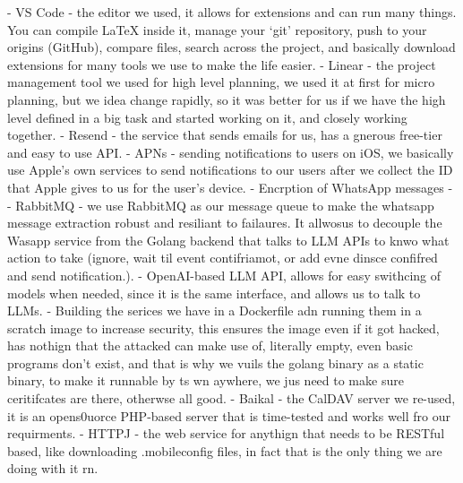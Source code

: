 - VS Code - the editor we used, it allows for extensions and can run many things. You can compile LaTeX inside it, manage your `git' repository, push to your origins (GitHub), compare files, search across the project, and basically download extensions for many tools we use to make the life easier.
- Linear - the project management tool we used for high level planning, we used it at first for micro planning, but we idea change rapidly, so it was better for us if we have the high level defined in a big task and started working on it, and closely working together.
- Resend - the service that sends emails for us, has a gnerous free-tier and easy to use API.
- APNs - sending notifications to users on iOS, we basically use Apple's own services to send notifications to our users after we collect the ID that Apple gives to us for the user's device.
- Encrption of WhatsApp messages - 
- RabbitMQ - we use RabbitMQ as our message queue to make the whatsapp message extraction robust and resiliant to failaures. It allwosus to decouple the Wasapp service from the Golang backend that talks to LLM APIs to knwo what action to take (ignore, wait til event contifriamot, or add evne dinsce confifred and send notification.).
- OpenAI-based LLM API, allows for easy swithcing of models when needed, since it is the same interface, and allows us to talk to LLMs.
- Building the serices we have in a Dockerfile adn running them in a scratch image to increase security, this ensures the image even if it got hacked, has nothign that the attacked can make use of, literally empty, even basic programs don't exist, and that is why we vuils the golang binary as a static binary, to make it runnable by ts wn aywhere, we jus need to make sure ceritifcates are there, otherwse all good.
- Baikal - the CalDAV server we re-used, it is an opens0uorce PHP-based server that is time-tested and works well fro our requirments.
- HTTPJ - the web service for anythign that needs to be RESTful based, like downloading .mobileconfig files, in fact that is the only thing we are doing with it rn.